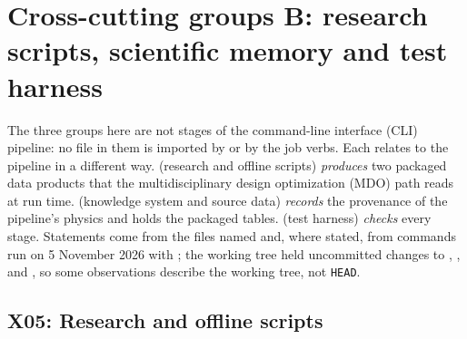 \chapter{Cross-cutting groups B: research scripts, scientific memory and test harness}\label{ch:crosscutting-b}
\newcommand{\chelevenTables}{\footnotesize\renewcommand{\code}[1]{{\footnotesize\path{##1}}}\setlength{\tabcolsep}{4pt}}

The three groups here are not stages of the command-line interface (CLI) pipeline: no file in them is imported by  or by the  job verbs. Each relates to the pipeline in a different way.  (research and offline scripts) \emph{produces} two packaged data products that the multidisciplinary design optimization (MDO) path reads at run time.  (knowledge system and source data) \emph{records} the provenance of the pipeline's physics and holds the packaged tables.  (test harness) \emph{checks} every stage. Statements come from the files named and, where stated, from commands run on 5 November 2026 with ; the working tree held uncommitted changes to , ,  and , so some observations describe the working tree, not \texttt{HEAD}.


\section{X05: Research and offline scripts}\label{sec:x05}

